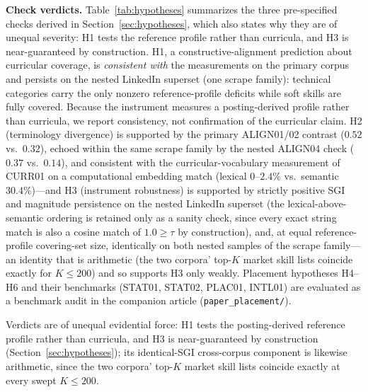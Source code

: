 \documentclass[journal]{IEEEtran}
\begin{document}
\textbf{Check verdicts.} Table~\ref{tab:hypotheses} summarizes the three pre-specified checks derived in Section~\ref{sec:hypotheses}, which also states why they are of unequal severity: H1 tests the reference profile rather than curricula, and H3 is near-guaranteed by construction. H1, a constructive-alignment prediction about curricular coverage, is \textit{consistent with} the measurements on the primary corpus and persists on the nested LinkedIn superset (one scrape family): technical categories carry the only nonzero reference-profile deficits while soft skills are fully covered. Because the instrument measures a posting-derived profile rather than curricula, we report consistency, not confirmation of the curricular claim. H2 (terminology divergence) is supported by the primary ALIGN01/02 contrast ($0.52$ vs.\ $0.32$), echoed within the same scrape family by the nested ALIGN04 check ($0.37$ vs.\ $0.14$), and consistent with the curricular-vocabulary measurement of CURR01 on a computational embedding match (lexical $0$--$2.4\%$ vs.\ semantic $30.4\%$)---and H3 (instrument robustness) is supported by strictly positive SGI and magnitude persistence on the nested LinkedIn superset (the lexical-above-semantic ordering is retained only as a sanity check, since every exact string match is also a cosine match of $1.0 \ge \tau$ by construction), and, at equal reference-profile covering-set size, identically on both nested samples of the scrape family---an identity that is arithmetic (the two corpora' top-$K$ market skill lists coincide exactly for $K \le 200$) and so supports H3 only weakly. Placement hypotheses H4--H6 and their benchmarks (STAT01, STAT02, PLAC01, INTL01) are evaluated as a benchmark audit in the companion article (\texttt{paper\_placement/}).

\begin{table}[!htbp]
\centering
\caption{Theory-Derived Pre-Specified Checks and Verdicts}
\label{tab:hypotheses}
\par\vspace{3pt}
{\footnotesize Verdicts are of unequal evidential force: H1 tests the
posting-derived reference profile rather than curricula, and H3 is
near-guaranteed by construction (Section~\ref{sec:hypotheses}); its
identical-SGI cross-corpus component is likewise arithmetic, since the two
corpora' top-$K$ market skill lists coincide exactly at every swept
$K \le 200$.}
\end{table}
\end{document}
